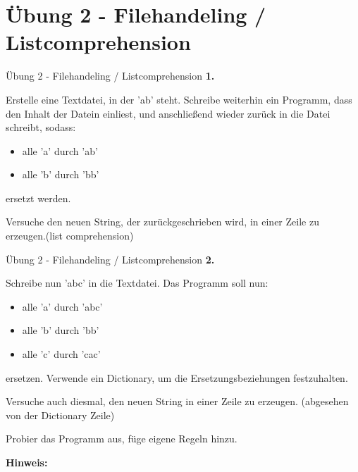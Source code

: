 \section{Übung 2 - Filehandeling / Listcomprehension}
\begin{frame}{Übung 2 - Filehandeling / Listcomprehension}
	\textbf{1.}
	
	Erstelle eine Textdatei, in der 'ab' steht. Schreibe weiterhin ein Programm, dass den Inhalt der Datein einliest, und anschließend wieder zurück in die Datei schreibt, sodass:
	\begin{itemize}
		\item alle \alert{'a'} durch \alert{'ab'}
		\item alle \alert{'b'} durch \alert{'bb'}
	\end{itemize}
	ersetzt werden.
	
	Versuche den neuen String, der zurückgeschrieben wird, in einer Zeile zu erzeugen.(list comprehension)
\end{frame}
\begin{frame}{Übung 2 - Filehandeling / Listcomprehension }
	\textbf{2.}
	
	Schreibe nun 'abc' in die Textdatei. Das Programm soll nun:
	\begin{itemize}
		\item alle \alert{'a'} durch \alert{'abc'}
		\item alle \alert{'b'} durch \alert{'bb'}
		\item alle \alert{'c'} durch \alert{'cac'}
	\end{itemize}
	ersetzen.
	Verwende ein Dictionary, um die Ersetzungsbeziehungen festzuhalten.
	
	Versuche auch diesmal, den neuen String in einer Zeile zu erzeugen. (abgesehen von der Dictionary Zeile)
	
	Probier das Programm aus, füge eigene Regeln hinzu.
	
	\textbf{Hinweis: }
\end{frame}


